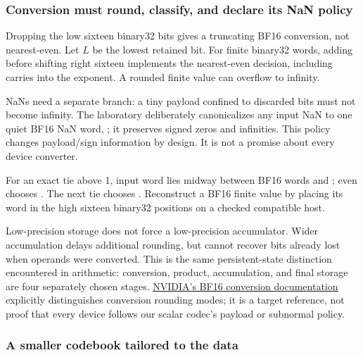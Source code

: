 \subsubsection{Conversion must round, classify, and declare its NaN policy}\label{01-foundations-i-ch001-conversion-must-round-classify-and-declare-its-nan-policy}

\hypertarget{01-foundations-i-ch001-conversion-must-round-classify-and-declare-its-nan-policy}{}

Dropping the low sixteen binary32 bits gives a truncating BF16 conversion, not nearest-even. Let \(L\) be the lowest retained bit. For finite binary32 words, adding  before shifting right sixteen implements the nearest-even decision, including carries into the exponent. A rounded finite value can overflow to infinity.

NaNs need a separate branch: a tiny payload confined to discarded bits must not become infinity. The laboratory deliberately canonicalizes any input NaN to one quiet BF16 NaN word, ; it preserves signed zeros and infinities. This policy changes payload/sign information by design. It is not a promise about every device converter.

For an exact tie above 1, input word  lies midway between BF16 words  and ; even chooses . The next tie  chooses . Reconstruct a BF16 finite value by placing its word in the high sixteen binary32 positions on a checked compatible host.

Low-precision storage does not force a low-precision accumulator. Wider accumulation delays additional rounding, but cannot recover bits already lost when operands were converted. This is the same persistent-state distinction encountered in arithmetic: conversion, product, accumulation, and final storage are four separately chosen stages. \href{https://docs.nvidia.com/cuda/cuda-math-api/cuda_math_api/group__CUDA__MATH____BFLOAT16__MISC.html}{NVIDIA's BF16 conversion documentation} explicitly distinguishes conversion rounding modes; it is a target reference, not proof that every device follows our scalar codec's payload or subnormal policy.

\subsubsection{A smaller codebook tailored to the data}\label{01-foundations-i-ch001-a-smaller-codebook-tailored-to-the-data}

